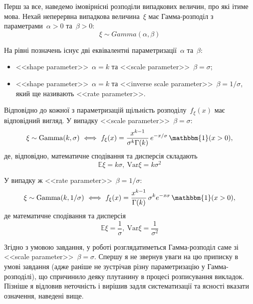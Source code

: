 Перш за все, наведемо імовірнісні розподіли випадкових величин, про які ітиме мова. Нехай неперервна випадкова величина~$\xi$ має Гамма-розподіл з параметрами~$\alpha>0$ та~$\beta>0:$
\begin{equation}
    \xi \sim Gamma(\alpha,\beta)
\end{equation}

На рівні позначень існує дві еквівалентні параметризації~$\alpha$ та~$\beta:$
\begin{itemize}
    \item <<shape parameter>>~$\alpha=k$ та <<scale parameter>>~$\beta=\sigma$;
    \item <<shape parameter>>~$\alpha=k$ та <<inverse scale parameter>>~$\beta=1/\sigma$, який ще називають <<rate parameter>>.
\end{itemize}

Відповідно до кожної з параметризацій щільність розподілу~$f_{\xi}(x)$ має відповідний вигляд. У випадку <<scale parameter>>~$\beta=\sigma:$ 
\begin{equation}\label{eq: dGamma scale parameter}
    \xi \sim \mathrm{Gamma}(k,\sigma) \ \Longleftrightarrow \ f_{\xi}(x) = \frac{x^{k-1}}{\sigma^{k}\Gamma(k)}\, e^{-x/\sigma}\, \mathbbm{1}(x>0), 
\end{equation}
де, відповідно, математичне сподівання та дисперсія складають
\begin{equation}\label{eq: dGamma scale parameter mean}
    \mathbb{E}\xi = k\sigma,\ \mathrm{Var}\xi=k\sigma^2
\end{equation}

У випадку ж <<rate parameter>>~$\beta=1/\sigma:$ 
\begin{equation}\label{eq: dGamma rate parameter}
    \xi \sim \mathrm{Gamma}(k,1/\sigma) \ \Longleftrightarrow \ f_{\xi}(x) = \frac{x^{k-1}}{\Gamma(k)}\,\sigma^{k} e^{-x\sigma}\, \mathbbm{1}(x>0), 
\end{equation}
де математичне сподівання та дисперсія
\begin{equation}\label{eq: dGamma rate parameter mean}
    \mathbb{E}\xi = \frac{1}{\sigma},\ \mathrm{Var}\xi=\frac{1}{\sigma^2}
\end{equation}

\begin{remark}
    Згідно з умовою завдання, у роботі розглядатиметься Гамма-розподіл саме зі <<scale parameter>>~$\beta=\sigma$. Спершу я не звернув уваги на цю приписку в умові завдання (адже раніше не зустрічав різну параметризацію у Гамма-розподілі), що спричинило деяку плутанину в процесі розписування викладок. Пізніше я відловив неточність і вирішив задля систематизації та ясності вказати означення, наведені вище.   
\end{remark}

